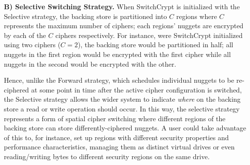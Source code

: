 
\textbf{B) Selective Switching Strategy.} When SwitchCrypt is initialized with
the Selective strategy, the backing store is partitioned into $C$ regions where
$C$ represents the maximum number of ciphers; each regions' nuggets are
encrypted by each of the $C$ ciphers respectively. For instance, were
SwitchCrypt initialized using two ciphers ($C = 2$), the backing store would be
partitioned in half; all nuggets in the first region would be encrypted with the
first cipher while all nuggets in the second would be encrypted with the other.

Hence, unlike the Forward strategy, which schedules individual nuggets to be
re-ciphered at some point in time after the active cipher configuration is
switched, the Selective strategy allows the wider system to indicate
\emph{where} on the backing store a read or write operation should occur. In
this way, the selective strategy represents a form of spatial cipher switching
where different regions of the backing store can store differently-ciphered
nuggets. A user could take advantage of this to, for instance, set up regions
with different security properties and performance characteristics, managing
them as distinct virtual drives or even reading/writing bytes to different
security regions on the same drive.

